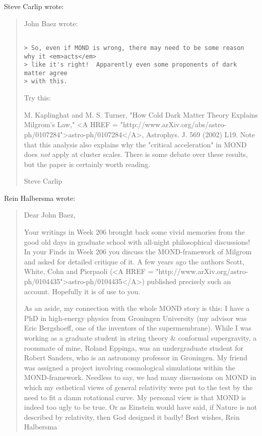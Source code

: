 Steve Carlip wrote:

\begin{quote}
John Baez wrote:


\begin{verbatim}

> So, even if MOND is wrong, there may need to be some reason why it <em>acts</em>
> like it's right!  Apparently even some proponents of dark matter agree 
> with this.  
\end{verbatim}
    


Try this:

M. Kaplinghat and M. S. Turner, "How Cold Dark Matter Theory Explains 
Milgrom's Law," 
<A HREF = "http://www.arXiv.org/abs/astro-ph/0107284">astro-ph/0107284</A>, 
Astrophys. J. 569 (2002) L19.  Note
that this analysis also explains why the "critical acceleration"
in MOND does \emph{not} apply at cluster scales.  There is some debate over
these results, but the paper is certainly worth reading.

Steve Carlip
\end{quote}

Rein Halbersma wrote:

\begin{quote}
Dear John Baez,

Your writings in Week 206 brought back some vivid memories from the good old 
days in graduate school with all-night philosophical discussions! In your 
Finds in Week 206 you discuss the MOND-framework of Milgrom and asked for 
detailed critique of it. A few years ago the authors Scott, White, Cohn and 
Pierpaoli (<A HREF = "http://www.arXiv.org/astro-ph/0104435">astro-ph/0104435</A>) published precisely such an account. 
Hopefully it is of use to you.

As an aside, my connection with the whole MOND story is this: I have a PhD in 
high-energy physics from Groningen University (my advisor was Eric 
Bergshoeff, one of the inventors of the supermembrane). While I was working 
as a graduate student in string theory & conformal supergravity, a 
roommate of mine, Roland Eppinga, was an undergraduate student for Robert 
Sanders, who is an astronomy professor in Groningen. My friend was assigned a 
project involving cosmological simulations within the MOND-framework. 
Needless to say, we had many discussions on MOND in which my esthetical 
views of general relativity were put to the test by the need to fit a 
damn rotational curve. 
My personal view is that MOND is indeed too ugly to be true. Or as Einstein 
would have said, if Nature is not described by relativity, then God 
designed it badly! 
Best wishes,
Rein Halbersma
\end{quote} 

